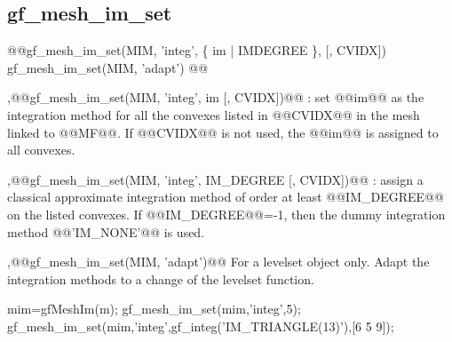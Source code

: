 \subsection{gf\_mesh\_im\_set}
\begin{synopsis}
@@gf\_mesh\_im\_set(MIM, 'integ', \{ \tinteg im | \tint IMDEGREE \}, [, \tivec CVIDX])
gf\_mesh\_im\_set(MIM, 'adapt')
@@\end{synopsis}
\begin{cmddescription}
  \sep{@@gf\_mesh\_im\_set(MIM, 'integ', im [, CVIDX])@@} : 
  set @@im@@ as the integration method for all
  the convexes listed in @@CVIDX@@ in the mesh linked to @@MF@@. If @@CVIDX@@ is not used,
  the @@im@@ is assigned to all convexes. 
  
  \sep{@@gf\_mesh\_im\_set(MIM, 'integ', IM\_DEGREE [, CVIDX])@@} :
  assign a classical approximate integration method of order at least @@IM_DEGREE@@ on the
  listed convexes. If @@IM_DEGREE@@=-1, then the dummy integration method
  @@'IM_NONE'@@ is used.

  \sep{@@gf\_mesh\_im\_set(MIM, 'adapt')@@}
  For a \tmim levelset object only. Adapt the integration methods to a
    change of the levelset function.
\end{cmddescription}
\begin{cmdexamples}
\begin{mcode}
mim=gfMeshIm(m);
gf_mesh_im_set(mim,'integ',5); 
gf_mesh_im_set(mim,'integ',gf_integ('IM_TRIANGLE(13)'),[6 5 9]);
\end{mcode}
\end{cmdexamples}
\newpage


